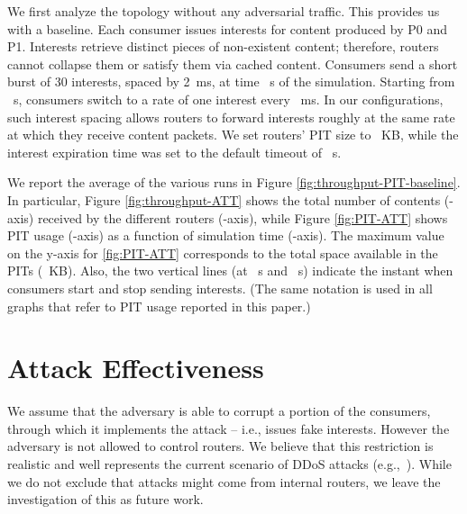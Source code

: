 \documentclass[10pt,conference,letterpaper]{IEEEtran}
\begin{document}
We first analyze the topology without any adversarial traffic. This provides us with a baseline. 
Each consumer issues interests for content produced by P0 and P1. Interests 
retrieve distinct pieces of non-existent content; therefore, routers cannot collapse them 
or satisfy them via cached content.
Consumers send a short burst of 30 interests, spaced by 2~ms, at time 
~s of the simulation.
Starting from ~s, consumers switch to a rate of one interest every ~ms. In 
our configurations, such interest spacing allows routers to forward interests roughly at 
the same rate at which they receive content packets.
We set routers' PIT size to ~KB, while the interest expiration time was set to the default 
timeout of ~s.

We report the average of the various runs in Figure \ref{fig:throughput-PIT-baseline}.
In particular, 
Figure \ref{fig:throughput-ATT} 
shows the total number of contents (-axis) received by the different routers (-axis), while 
Figure \ref{fig:PIT-ATT} shows PIT usage (-axis) as a 
function of simulation time (-axis). 
The maximum value on the y-axis for 
\ref{fig:PIT-ATT} 
corresponds to the total space available in the PITs (~KB). Also, the two vertical 
lines (at ~s and ~s) indicate the instant when consumers start and stop 
sending interests. (The same notation is used in all graphs that refer to PIT usage 
reported in this paper.)

 \begin{figure*}[]
 \centering
{}
 \hspace{-3mm}
 \caption{Baseline behavior (no attack)\label{fig:throughput-PIT-baseline}}
 \end{figure*}






\section{Attack Effectiveness}
\label{attack Effectiveness}
We assume that the adversary is able to corrupt a portion of the consumers, through which it implements the attack -- i.e.,
issues fake interests. However the adversary is not allowed to control routers. We 
believe that this restriction is realistic and well represents the current scenario of 
DDoS attacks (e.g.,~\cite{ioncannon}).
While we do not exclude that attacks might come from internal routers, we 
leave the investigation of this as future work.
\end{document}
